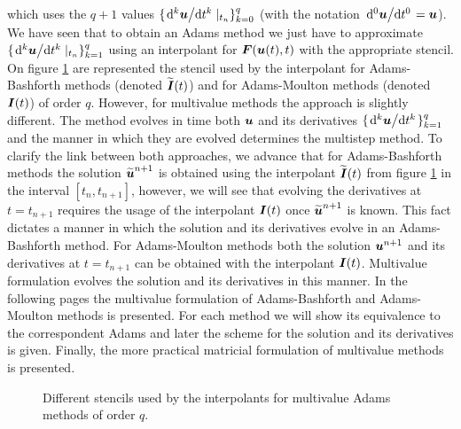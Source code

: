 which uses the $q+1$ values $\{  \dv*[k]{\boldsymbol{u}}{t} |_{t_n} \}_{k=0}^{q}$ (with the notation $\dv*[0]{\boldsymbol{u}}{t}=\boldsymbol{u}$). We have seen that to obtain an Adams method we just have to approximate $\{  \dv*[k]{\boldsymbol{u}}{t} |_{t_n} \}_{k=1}^{q}$ using an interpolant for $\boldsymbol{F}(\boldsymbol{u}(t),t)$ with the appropriate stencil. On figure \ref{fig:Multivalue_ABM_Stencil} are represented the stencil used by the interpolant for Adams-Bashforth methods (denoted $\widetilde{\boldsymbol{I}}(t)$) and for Adams-Moulton methods (denoted $\boldsymbol{I}(t)$) of order $q$. However, for multivalue methods the approach is slightly different. The method evolves in time both $\boldsymbol{u}$ and its derivatives $\{ \dv*[k]{\boldsymbol{u}}{t} \}_{k=1}^{q}$ and the manner in which they are evolved determines the multistep method. To clarify the link between both approaches, we advance that for Adams-Bashforth methods the solution $\widetilde{\boldsymbol{u}}^{n+1}$ is obtained using the interpolant $\widetilde{\boldsymbol{I}}(t)$ from figure \ref{fig:Multivalue_ABM_Stencil} in the interval $[t_n,t_{n+1}]$, however, we will see that evolving the derivatives at $t=t_{n+1}$ requires the usage of the interpolant $\boldsymbol{I}(t)$ once $\widetilde{\boldsymbol{u}}^{n+1}$ is known. This fact dictates a manner in which the solution and its derivatives evolve in an Adams-Bashforth method. For Adams-Moulton methods both the solution $ \boldsymbol{u}^{n+1}$ and its derivatives at $t=t_{n+1}$ can be obtained with the interpolant $\boldsymbol{I}(t)$. Multivalue formulation evolves the solution and its derivatives in this manner. In the following pages the multivalue formulation of Adams-Bashforth and Adams-Moulton methods is presented. For each method we will show its equivalence to the correspondent Adams and later the scheme for the solution and its derivatives is given. Finally, the more practical matricial formulation of multivalue methods is presented.    

\FloatBarrier
\begin{figure}[h]
	\MultivalueABMStencil{}
	\caption{Different stencils used by the interpolants for multivalue Adams methods of order $q$.}
	\label{fig:Multivalue_ABM_Stencil}
\end{figure}

 




